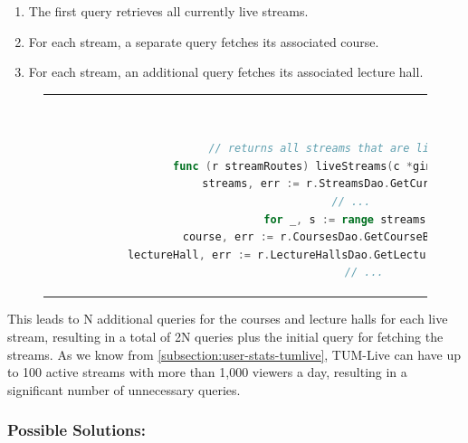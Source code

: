 \begin{enumerate}
    \item The first query retrieves all currently live streams.
    \item For each stream, a separate query fetches its associated course.
    \item For each stream, an additional query fetches its associated lecture hall.
\end{enumerate}
\begin{figure}[htpb]
  \begin{tabular}{c}
  \ \small \begin{lstlisting}[language=Go]
    // returns all streams that are live
    func (r streamRoutes) liveStreams(c *gin.Context) {
        streams, err := r.StreamsDao.GetCurrentLive(c)
        // ...
        for _, s := range streams {
            course, err := r.CoursesDao.GetCourseById(c, s.CourseID)
            lectureHall, err := r.LectureHallsDao.GetLectureHallByID(s.LectureHallID)
            // ...
    \end{lstlisting}
  \end{tabular}
  \label{fig:n+1-example-livestreams}
\end{figure}

This leads to N additional queries for the courses and lecture halls for each live stream, resulting in a total of 2N queries plus the initial query for fetching the streams. As we know from \autoref{subsection:user-stats-tumlive}, TUM-Live can have up to 100 active streams with more than 1,000 viewers a day, resulting in a significant number of unnecessary queries.

\subsubsection{Possible Solutions:}

